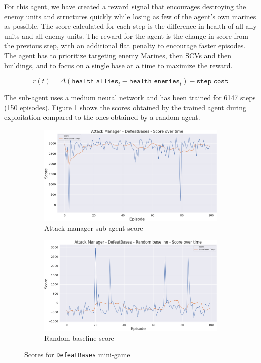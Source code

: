 For this agent, we have created a reward signal that encourages destroying the enemy units and structures quickly while losing as few of the agent's own marines as possible. The score calculated for each step is the difference in health of all ally units and all enemy units. The reward for the agent is the change in score from the previous step, with an additional flat penalty to encourage faster episodes. The agent has to prioritize targeting enemy Marines, then SCVs and then buildings, and to focus on a single base at a time to maximize the reward.

$$
r(t) = \Delta(\texttt{health\_allies}_{t} - \texttt{health\_enemies}_{t}) - \texttt{step\_cost}
$$

The sub-agent uses a medium neural network and has been trained for 6147 steps (150 episodes). Figure \ref{fig:DefeatBases_scores} shows the scores obtained by the trained agent during exploitation compared to the ones obtained by a random agent.

\begin{figure}[t]
    \centering
    \begin{subfigure}[b]{0.48\textwidth}
        \includegraphics[width=1\textwidth]{figs/multi_dqn_army_attack_manager/exploit/score.png}
        \caption{Attack manager sub-agent score}
    \end{subfigure}
    \hfill
    \begin{subfigure}[b]{0.48\textwidth}
        \includegraphics[width=1\textwidth]{figs/multi_random_army_attack_manager/exploit/score.png}
        \caption{Random baseline score}
    \end{subfigure}
    \caption{Scores for \texttt{DefeatBases} mini-game}
    \label{fig:DefeatBases_scores}
\end{figure}

